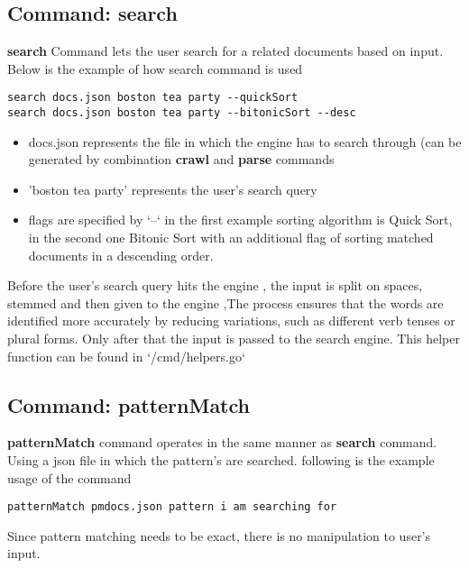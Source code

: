 \subsection{Command: search}
\textbf{search} Command lets the user search for a related documents based on input. Below is the example of how search command is used
\begin{verbatim}
search docs.json boston tea party --quickSort
search docs.json boston tea party --bitonicSort --desc
\end{verbatim}
\begin{itemize}
    \item docs.json represents the file in which the engine has to search through (can be generated by combination \textbf{crawl} and \textbf{parse} commands
    \item 'boston tea party' represents the user's search query
    \item flags are specified by `--` in the first example sorting algorithm is Quick Sort, in the second one Bitonic Sort with an additional flag of sorting matched documents in a descending order.
\end{itemize}
Before the user's search query hits the engine , the input is split on spaces, stemmed and then given to the engine ,The process ensures that the words are identified more accurately by reducing variations, such as different verb tenses or plural forms. Only after that the input is passed to the search engine. This helper function can be found in `/cmd/helpers.go`

\subsection{Command: patternMatch}
\textbf{patternMatch} command operates in the same manner as \textbf{search} command. Using a json file in which the pattern's are searched. following is the example usage of the command
\begin{verbatim}
patternMatch pmdocs.json pattern i am searching for
\end{verbatim}
Since pattern matching needs to be exact, there is no manipulation to user's input.